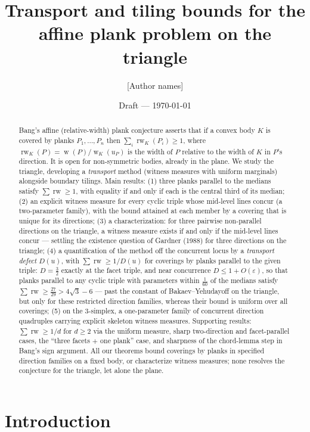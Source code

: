 \documentclass[11pt,reqno]{amsart}
\title{Transport and tiling bounds for the affine plank problem on the triangle}
\author{[Author names]}
\date{Draft --- \today}
\theoremstyle{plain}
\theoremstyle{definition}
\theoremstyle{remark}
\newcommand{\rw}{\operatorname{rw}}
\DeclareMathOperator{\wid}{w}
\begin{document}
\begin{abstract}
Bang's affine (relative-width) plank conjecture asserts that if a convex body $K$
is covered by planks $P_1,\dots,P_n$ then $\sum_i \rw_K(P_i)\ge 1$, where
$\rw_K(P)=\wid(P)/\wid_K(u_P)$ is the width of $P$ relative to the width of $K$ in
$P$'s direction. It is open for non-symmetric bodies, already in the plane. We
study the triangle, developing a \emph{transport} method (witness measures with
uniform marginals) alongside boundary tilings. Main results: (1) three planks
parallel to the medians satisfy $\sum\rw\ge1$, with equality if and only if each
is the central third of its median; (2) an explicit witness measure for every
cyclic triple whose mid-level lines concur (a two-parameter family), with the
bound attained at each member by a covering that is unique for its directions;
(3) a characterization: for three pairwise non-parallel directions on the
triangle, a witness measure exists if and only if the mid-level lines concur ---
settling the existence question of Gardner (1988) for three directions on the
triangle; (4) a quantification of the method off the concurrent locus by a
\emph{transport defect} $D(u)$, with $\sum\rw\ge1/D(u)$ for coverings by planks
parallel to the given triple: $D=\tfrac32$ exactly at the facet triple, and near
concurrence $D\le1+O(\varepsilon)$, so that planks parallel to any cyclic triple
with parameters within $\tfrac1{60}$ of the medians satisfy
$\sum\rw\ge\tfrac{27}{29}>4\sqrt3-6$ --- past the constant of
Bakaev--Yehudayoff on the triangle, but only for these restricted direction
families, whereas their bound is uniform over all coverings; (5) on the
$3$-simplex, a one-parameter family of concurrent direction quadruples carrying
explicit skeleton witness measures. Supporting results: $\sum\rw\ge1/d$ for
$d\ge2$ via the uniform measure, sharp two-direction and facet-parallel cases,
the ``three facets $+$ one plank'' case, and sharpness of the chord-lemma step
in Bang's sign argument. All our theorems bound coverings by planks in specified
direction families on a fixed body, or characterize witness measures; none
resolves the conjecture for the triangle, let alone the plane.
\end{abstract}
\maketitle

\section{Introduction}\label{sec:intro}
\end{document}
